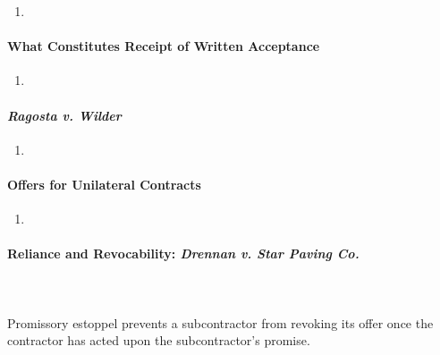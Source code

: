 \begin{enumerate}
    \item %
\end{enumerate}

\paragraph{What Constitutes Receipt of Written Acceptance}

\begin{enumerate}
    \item %
\end{enumerate}

\paragraph{\emph{Ragosta v. Wilder}}

\begin{enumerate}
    \item %
\end{enumerate}

\paragraph{Offers for Unilateral Contracts}

\begin{enumerate}
    \item %
\end{enumerate}

\paragraph{Reliance and Revocability: \emph{Drennan v. Star Paving Co.}}
~\\\\
Promissory estoppel prevents a subcontractor from revoking its offer once the 
contractor has acted upon the subcontractor's promise.

